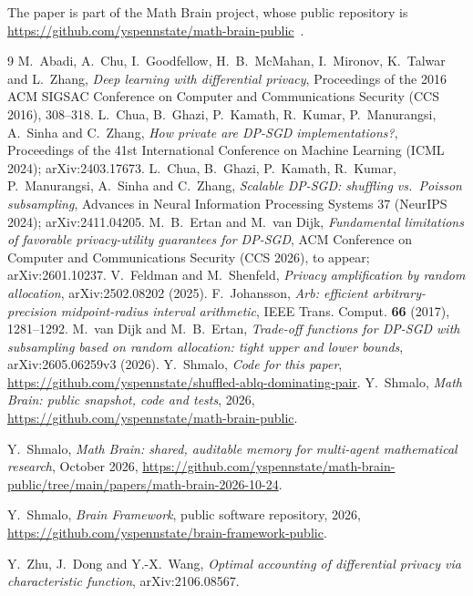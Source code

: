 \documentclass[11pt]{amsart}
\theoremstyle{definition}
\theoremstyle{remark}
\begin{document}
The paper is part of the Math Brain project, whose public repository is \url{https://github.com/yspennstate/math-brain-public}~\cite{MathBrainRepo}.

\begin{thebibliography}{9}
 M.~Abadi, A.~Chu, I.~Goodfellow, H.~B.~McMahan, I.~Mironov, K.~Talwar and L.~Zhang, \emph{Deep learning with differential privacy}, Proceedings of the 2016 ACM SIGSAC Conference on Computer and Communications Security (CCS 2016), 308--318.
L.~Chua, B.~Ghazi, P.~Kamath, R.~Kumar, P.~Manurangsi, A.~Sinha and C.~Zhang, \emph{How private are DP-SGD implementations?}, Proceedings of the 41st International Conference on Machine Learning (ICML 2024); arXiv:2403.17673.
 L.~Chua, B.~Ghazi, P.~Kamath, R.~Kumar, P.~Manurangsi, A.~Sinha and C.~Zhang, \emph{Scalable DP-SGD: shuffling vs.\ Poisson subsampling}, Advances in Neural Information Processing Systems 37 (NeurIPS 2024); arXiv:2411.04205.
 M.~B.~Ertan and M.~van Dijk, \emph{Fundamental limitations of favorable privacy-utility guarantees for DP-SGD}, ACM Conference on Computer and Communications Security (CCS 2026), to appear; arXiv:2601.10237.
 V.~Feldman and M.~Shenfeld, \emph{Privacy amplification by random allocation}, arXiv:2502.08202 (2025).
 F.~Johansson, \emph{Arb: efficient arbitrary-precision midpoint-radius interval arithmetic}, IEEE Trans. Comput. \textbf{66} (2017), 1281--1292.
 M.~van Dijk and M.~B.~Ertan, \emph{Trade-off functions for DP-SGD with subsampling based on random allocation: tight upper and lower bounds}, arXiv:2605.06259v3 (2026).
 Y.~Shmalo, \emph{Code for this paper}, \url{https://github.com/yspennstate/shuffled-ablq-dominating-pair}.
 Y.~Shmalo, \emph{Math Brain: public snapshot, code and tests}, 2026, \url{https://github.com/yspennstate/math-brain-public}.

 Y.~Shmalo, \emph{Math Brain: shared, auditable memory for multi-agent mathematical research}, October 2026, \url{https://github.com/yspennstate/math-brain-public/tree/main/papers/math-brain-2026-10-24}.

 Y.~Shmalo, \emph{Brain Framework}, public software repository, 2026, \url{https://github.com/yspennstate/brain-framework-public}.

 Y.~Zhu, J.~Dong and Y.-X.~Wang, \emph{Optimal accounting of differential privacy via characteristic function}, arXiv:2106.08567.
\end{thebibliography}
\end{document}
